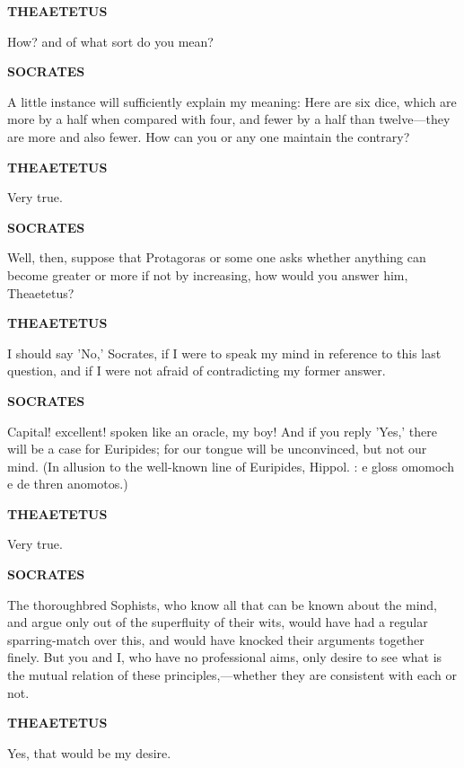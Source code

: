 \documentclass[11pt,letter]{article}
\begin{document}
\par \textbf{THEAETETUS}
\par   How? and of what sort do you mean?

\par \textbf{SOCRATES}
\par   A little instance will sufficiently explain my meaning:  Here are six dice, which are more by a half when compared with four, and fewer by a half than twelve—they are more and also fewer. How can you or any one maintain the contrary?

\par \textbf{THEAETETUS}
\par   Very true.

\par \textbf{SOCRATES}
\par   Well, then, suppose that Protagoras or some one asks whether anything can become greater or more if not by increasing, how would you answer him, Theaetetus?

\par \textbf{THEAETETUS}
\par   I should say 'No,' Socrates, if I were to speak my mind in reference to this last question, and if I were not afraid of contradicting my former answer.

\par \textbf{SOCRATES}
\par   Capital! excellent! spoken like an oracle, my boy! And if you reply 'Yes,' there will be a case for Euripides; for our tongue will be unconvinced, but not our mind. (In allusion to the well-known line of Euripides, Hippol. :  e gloss omomoch e de thren anomotos.)

\par \textbf{THEAETETUS}
\par   Very true.

\par \textbf{SOCRATES}
\par   The thoroughbred Sophists, who know all that can be known about the mind, and argue only out of the superfluity of their wits, would have had a regular sparring-match over this, and would have knocked their arguments together finely. But you and I, who have no professional aims, only desire to see what is the mutual relation of these principles,—whether they are consistent with each or not.

\par \textbf{THEAETETUS}
\par   Yes, that would be my desire.
\end{document}
